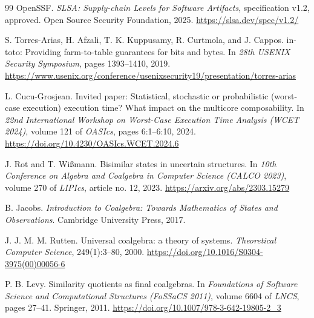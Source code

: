 \begin{thebibliography}{99}
OpenSSF.
\newblock \emph{SLSA: Supply-chain Levels for Software Artifacts}, specification
v1.2, approved.
\newblock Open Source Security Foundation, 2025.
\newblock \url{https://slsa.dev/spec/v1.2/}

S. Torres-Arias, H. Afzali, T. K. Kuppusamy, R. Curtmola, and J. Cappos.
\newblock in-toto: Providing farm-to-table guarantees for bits and bytes.
\newblock In \emph{28th USENIX Security Symposium}, pages 1393--1410, 2019.
\newblock \url{https://www.usenix.org/conference/usenixsecurity19/presentation/torres-arias}

L. Cucu-Grosjean.
\newblock Invited paper: Statistical, stochastic or probabilistic (worst-case
execution) execution time? What impact on the multicore composability.
\newblock In \emph{22nd International Workshop on Worst-Case Execution Time
Analysis (WCET 2024)}, volume 121 of \emph{OASIcs}, pages 6:1--6:10, 2024.
\newblock \url{https://doi.org/10.4230/OASIcs.WCET.2024.6}


J. Rot and T. Wi{\ss}mann.
\newblock Bisimilar states in uncertain structures.
\newblock In \emph{10th Conference on Algebra and Coalgebra in Computer Science
(CALCO 2023)}, volume 270 of \emph{LIPIcs}, article no. 12, 2023.
\newblock \url{https://arxiv.org/abs/2303.15279}

B. Jacobs.
\newblock \emph{Introduction to Coalgebra: Towards Mathematics of States and
Observations}.
\newblock Cambridge University Press, 2017.

J. J. M. M. Rutten.
\newblock Universal coalgebra: a theory of systems.
\newblock \emph{Theoretical Computer Science}, 249(1):3--80, 2000.
\newblock \url{https://doi.org/10.1016/S0304-3975(00)00056-6}

P. B. Levy.
\newblock Similarity quotients as final coalgebras.
\newblock In \emph{Foundations of Software Science and Computational Structures
(FoSSaCS 2011)}, volume 6604 of \emph{LNCS}, pages 27--41. Springer, 2011.
\newblock \url{https://doi.org/10.1007/978-3-642-19805-2_3}


\end{thebibliography}
